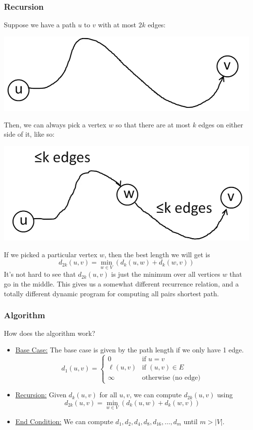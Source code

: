 \documentclass[letterpaper]{article}
\begin{document}
\subsubsection{Recursion}
Suppose we have a path $u$ to $v$ with at most $2k$ edges: 
\begin{center}
    \includegraphics[scale=0.5]{../assets/sp_2.png}
\end{center}
Then, we can always pick a vertex $w$ so that there are at most $k$ edges on either side of it, like so: 
\begin{center}
    \includegraphics[scale=0.5]{../assets/sp_3.png}
\end{center}
If we picked a particular vertex $w$, then the best length we will get is 
\[d_{2k}(u, v) = \min_{w \in V} (d_{k}(u, w) + d_{k}(w, v))\]
It's not hard to see that $d_{2k}(u, v)$ is just the minimum over all vertices $w$ that go in the middle. This gives us a somewhat different recurrence relation, and a totally different dynamic program for computing all pairs shortest path. 


\subsubsection{Algorithm}
How does the algorithm work? 

\begin{itemize}
    \item \underline{Base Case:} The base case is given by the path length if we only have 1 edge. 
    \[d_{1}(u, v) = \begin{cases}
        0 & \text{if } u = v \\ 
        \ell(u, v) & \text{if } (u, v) \in E \\ 
        \infty & \text{otherwise (no edge)} 
    \end{cases}\]

    \item \underline{Recursion:} Given $d_{k}(u, v)$ for all $u, v$, we can compute $d_{2k}(u, v)$ using 
    \[d_{2k}(u, v) = \min_{w \in V} (d_{k}(u, w) + d_{k}(w, v))\]

    \item \underline{End Condition:} We can compute $d_1, d_2, d_4, d_8, d_{16}, \dots, d_m$ until $m > |V|$. 
\end{itemize}
\end{document}
